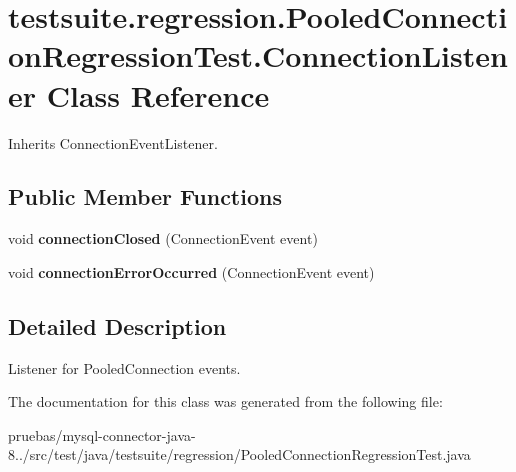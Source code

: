 \hypertarget{classtestsuite_1_1regression_1_1_pooled_connection_regression_test_1_1_connection_listener}{}\section{testsuite.\+regression.\+Pooled\+Connection\+Regression\+Test.\+Connection\+Listener Class Reference}
\label{classtestsuite_1_1regression_1_1_pooled_connection_regression_test_1_1_connection_listener}


Inherits Connection\+Event\+Listener.

\subsection*{Public Member Functions}
\begin{DoxyCompactItemize}
\item 
\mbox{\label{classtestsuite_1_1regression_1_1_pooled_connection_regression_test_1_1_connection_listener_ad3a7a8137c8631da7c590cf9ae14d632}} 
void {\bfseries connection\+Closed} (Connection\+Event event)
\item 
\mbox{\label{classtestsuite_1_1regression_1_1_pooled_connection_regression_test_1_1_connection_listener_ad64bb73a2b6c66d5608528771c7f014a}} 
void {\bfseries connection\+Error\+Occurred} (Connection\+Event event)
\end{DoxyCompactItemize}


\subsection{Detailed Description}
Listener for Pooled\+Connection events. 

The documentation for this class was generated from the following file\+:\begin{DoxyCompactItemize}
\item 
pruebas/mysql-\/connector-\/java-\/8../src/test/java/testsuite/regression/Pooled\+Connection\+Regression\+Test.\+java\end{DoxyCompactItemize}
